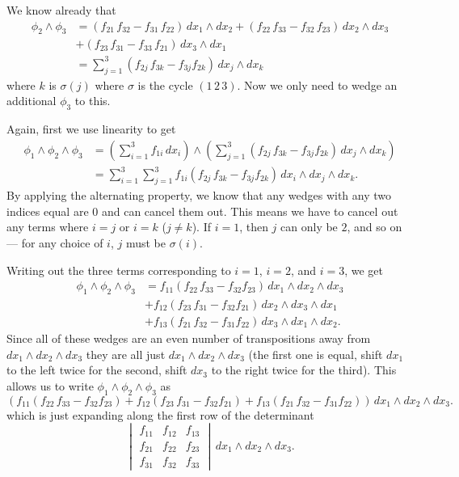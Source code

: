 \documentclass[12 pt, letterpaper]{hmcpset}
\begin{document}
\begin{solution}
	We know already that
	\[
		\begin{split}
		\phi_2 \wedge \phi_3 & = (f_{21} \, f_{32} - f_{31} \, f_{22}) \, dx_1 \wedge dx_2 + (f_{22} \, f_{33} - f_{32} \, f_{23}) \, dx_2 \wedge dx_3 \\
				     & + (f_{23} \, f_{31} - f_{33} \, f_{21}) \, dx_3 \wedge dx_1 \\
		& = \sum_{j = 1}^3 (f_{2j} \, f_{3k} - f_{3j} f_{2k}) \, dx_j \wedge dx_k
		\end{split}
	\]
	where $k$ is $\sigma(j)$ where $\sigma$ is the cycle $(1 \, 2 \, 3)$. Now we only need to wedge an additional $\phi_3$ to this. 

	Again, first we use linearity to get
	\[
		\begin{split}
			\phi_1 \wedge \phi_2 \wedge \phi_3 & = \left ( \sum_{i = 1}^3 f_{1 i} \, dx_i \right ) \wedge \left ( \sum_{j = 1}^3 (f_{2j} \, f_{3k} - f_{3j} f_{2k}) \, dx_j \wedge dx_k \right ) \\
							   & = \sum_{i = 1}^3 \sum_{j = 1}^3 f_{1 i} (f_{2j} \, f_{3k} - f_{3j} f_{2k}) \, dx_i \wedge dx_j \wedge dx_k.
		\end{split}
	\]
	By applying the alternating property, we know that any wedges with any two indices equal are $0$ and can cancel them out. This means we have to cancel out any terms where $i = j$ or $i = k$ ($j \neq k$). If $i = 1$, then $j$ can only be $2$, and so on --- for any choice of $i$, $j$ must be $\sigma(i)$. 

	Writing out the three terms corresponding to $i = 1$, $i = 2$, and $i = 3$, we get
	\[
		\begin{split}
			\phi_1 \wedge \phi_2 \wedge \phi_3 & = f_{1 1} (f_{2 2} \, f_{3 3} - f_{3 2} f_{2 3}) \, dx_1 \wedge dx_2 \wedge dx_3 \\ 
							   & + f_{1 2} (f_{2 3} \, f_{3 1} - f_{3 2} f_{2 1}) \, dx_2 \wedge dx_3 \wedge dx_1 \\
							   & + f_{1 3} (f_{2 1} \, f_{3 2} - f_{3 1} f_{2 2}) \, dx_3 \wedge dx_1 \wedge dx_2.
		\end{split}
	\]
	Since all of these wedges are an even number of transpositions away from $dx_1 \wedge dx_2 \wedge dx_3$ they are all just $dx_1 \wedge dx_2 \wedge dx_3$ (the first one is equal, shift $dx_1$ to the left twice for the second, shift $dx_3$ to the right twice for the third). This allows us to write $\phi_1 \wedge \phi_2 \wedge \phi_3$ as
	\[
		(f_{1 1} (f_{2 2} \, f_{3 3} - f_{3 2} f_{2 3}) + f_{1 2} (f_{2 3} \, f_{3 1} - f_{3 2} f_{2 1}) + f_{1 3} (f_{2 1} \, f_{3 2} - f_{3 1} f_{2 2})) \, dx_1 \wedge dx_2 \wedge dx_3.
	\]
	which is just expanding along the first row of the determinant
	\[
		\begin{vmatrix}
			f_{11} & f_{12} & f_{13} \\
			f_{21} & f_{22} & f_{23} \\
			f_{31} & f_{32} & f_{33}
		\end{vmatrix} \, dx_1 \wedge dx_2 \wedge dx_3.
	\]

\end{solution}
\end{document}
